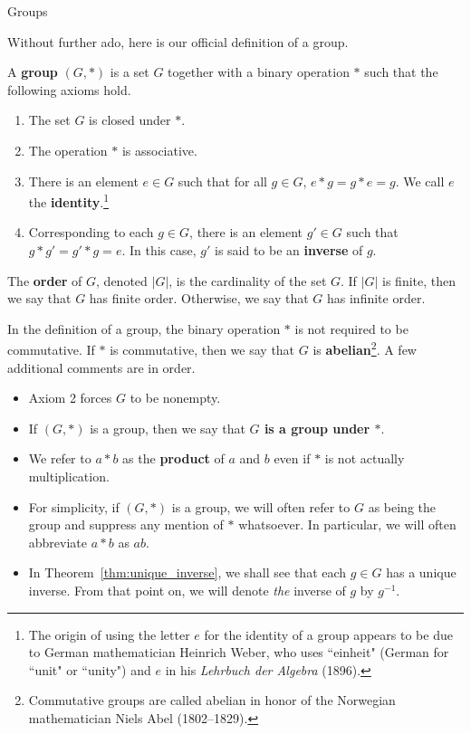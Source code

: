 \begin{section}{Groups}


Without further ado, here is our official definition of a group.

\begin{definition}\label{def:group}
A \textbf{group} $(G,*)$ is a set $G$ together with a binary operation $*$ such that the following axioms hold.
\begin{enumerate}
\item[(0)] The set $G$ is closed under $*$.
\item[(1)] The operation $*$ is associative.
\item[(2)] There is an element $e\in G$ such that for all $g\in G$, $e*g=g*e=g$.  We call $e$ the \textbf{identity}.\footnote{The origin of using the letter $e$ for the identity of a group appears to be due to German mathematician Heinrich Weber, who uses ``einheit" (German for ``unit" or ``unity") and $e$ in his \emph{Lehrbuch der Algebra} (1896).}
\item[(3)] Corresponding to each $g\in G$, there is an element $g'\in G$ such that $g*g'=g'*g=e$.  In this case, $g'$ is said to be an \textbf{inverse} of $g$.
\end{enumerate}
The \textbf{order} of $G$, denoted $|G|$, is the cardinality of the set $G$. If $|G|$ is finite, then we say that $G$ has finite order. Otherwise, we say that $G$ has infinite order.
\end{definition}

In the definition of a group, the binary operation $*$ is not required to be commutative.  If $*$ is commutative, then we say that $G$ is \textbf{abelian}\footnote{Commutative groups are called abelian in honor of the Norwegian mathematician Niels Abel (1802--1829).}. A few additional comments are in order.
\begin{itemize}
\item Axiom 2 forces $G$ to be nonempty.
\item If $(G,*)$ is a group, then we say that \textbf{$G$ is a group under $*$}.
\item We refer to $a*b$ as the \textbf{product} of $a$ and $b$ even if $*$ is not actually multiplication. 
\item For simplicity, if $(G,*)$ is a group, we will often refer to $G$ as being the group and suppress any mention of $*$ whatsoever.  In particular, we will often abbreviate $a*b$ as $ab$.
\item In Theorem~\ref{thm:unique_inverse}, we shall see that each $g\in G$ has a unique inverse.  From that point on, we will denote \emph{the} inverse of $g$ by $g^{-1}$.
\end{itemize}


\end{section}
